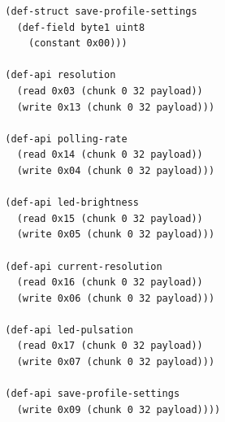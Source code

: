 \documentclass[12pt]{article}
\begin{document}
\begin{verbatim}
  (def-struct save-profile-settings
    (def-field byte1 uint8
      (constant 0x00)))

  (def-api resolution
    (read 0x03 (chunk 0 32 payload))
    (write 0x13 (chunk 0 32 payload)))

  (def-api polling-rate
    (read 0x14 (chunk 0 32 payload))
    (write 0x04 (chunk 0 32 payload)))

  (def-api led-brightness
    (read 0x15 (chunk 0 32 payload))
    (write 0x05 (chunk 0 32 payload)))

  (def-api current-resolution
    (read 0x16 (chunk 0 32 payload))
    (write 0x06 (chunk 0 32 payload)))

  (def-api led-pulsation
    (read 0x17 (chunk 0 32 payload))
    (write 0x07 (chunk 0 32 payload)))

  (def-api save-profile-settings
    (write 0x09 (chunk 0 32 payload))))
\end{verbatim}
\end{document}
